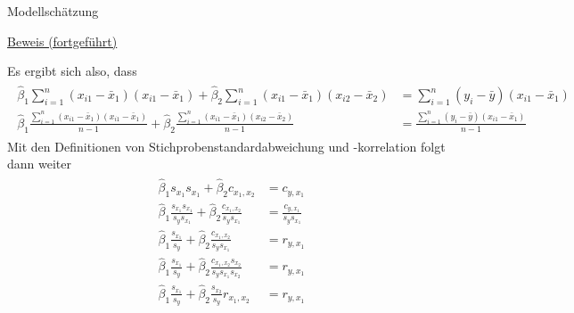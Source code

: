 \documentclass[
  8pt,
  ignorenonframetext,
]{beamer}
\begin{document}
\begin{frame}{Modellschätzung}
\protect\hypertarget{modellschuxe4tzung-8}{}
\footnotesize

\underline{Beweis (fortgeführt)}

Es ergibt sich also, dass \tiny \begin{align}
\begin{split}
  \hat{\beta}_1 \sum_{i=1}^n (x_{i1}-\bar{x}_1)(x_{i1}-\bar{x}_1)
+ \hat{\beta}_2 \sum_{i=1}^n (x_{i1}-\bar{x}_1)(x_{i2}-\bar{x}_2)
&
= \sum_{i=1}^n (y_i-\bar{y})(x_{i1}-\bar{x}_1)
\\
  \hat{\beta}_1 \frac{\sum_{i=1}^n (x_{i1}-\bar{x}_1)(x_{i1}-\bar{x}_1)}{n-1}
+ \hat{\beta}_2 \frac{\sum_{i=1}^n (x_{i1}-\bar{x}_1)(x_{i2}-\bar{x}_2)}{n-1}
&
= \frac{\sum_{i=1}^n (y_i-\bar{y})(x_{i1}-\bar{x}_1)}{n-1}
\end{split}
\end{align} \footnotesize Mit den Definitionen von
Stichprobenstandardabweichung und -korrelation folgt dann weiter \tiny
\begin{align}
\begin{split}
  \hat{\beta}_1  s_{x_1}s_{x_1}
+ \hat{\beta}_2c_{x_1,x_2}
&
= c_{y,x_1}
\\
  \hat{\beta}_1  \frac{s_{x_1}s_{x_1}}{s_ys_{x_1}}
+ \hat{\beta}_2  \frac{c_{x_1,x_2}}{s_ys_{x_1}}
&
= \frac{c_{y,x_1}}{s_ys_{x_1}}
\\
  \hat{\beta}_1  \frac{s_{x_1}}{s_y}
+ \hat{\beta}_2  \frac{c_{x_1,x_2}}{s_ys_{x_1}}
&
= r_{y,x_1}
\\
  \hat{\beta}_1  \frac{s_{x_1}}{s_y}
+ \hat{\beta}_2  \frac{c_{x_1,x_2}s_{x_2}}{s_ys_{x_1}s_{x_2}}
&
= r_{y,x_1}
\\
  \hat{\beta}_1  \frac{s_{x_1}}{s_y}
+ \hat{\beta}_2  \frac{s_{x_2}}{s_y}r_{x_1,x_2}
&
= r_{y,x_1}
\end{split}
\end{align}
\end{frame}
\end{document}
